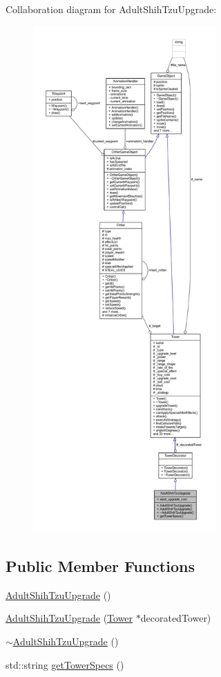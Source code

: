 Collaboration diagram for Adult\+Shih\+Tzu\+Upgrade\+:
\nopagebreak
\begin{figure}[H]
\begin{center}
\leavevmode
\includegraphics[height=550pt]{class_adult_shih_tzu_upgrade__coll__graph}
\end{center}
\end{figure}
\subsection*{Public Member Functions}
\begin{DoxyCompactItemize}
\item 
\hyperlink{class_adult_shih_tzu_upgrade_a61934af82621935aeff025feb0e4a2a6}{Adult\+Shih\+Tzu\+Upgrade} ()
\item 
\hyperlink{class_adult_shih_tzu_upgrade_a85e7b1079bb72002fb0873337435dc49}{Adult\+Shih\+Tzu\+Upgrade} (\hyperlink{class_tower}{Tower} $\ast$decorated\+Tower)
\item 
\hyperlink{class_adult_shih_tzu_upgrade_aa3cb3b02006c7d0cc20f319c24dba07f}{$\sim$\+Adult\+Shih\+Tzu\+Upgrade} ()
\item 
std\+::string \hyperlink{class_adult_shih_tzu_upgrade_afd0c6011047f5c5e89eb4c0428744df5}{get\+Tower\+Specs} ()
\end{DoxyCompactItemize}

